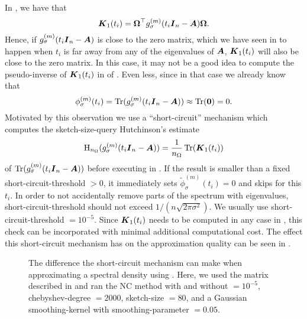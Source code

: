 In , we have that
\begin{equation}
    \boldsymbol{K}_1(t_i) = \boldsymbol{\Omega}^{\top} g_{\sigma}^{(m)}(t_i\boldsymbol{I}_n - \boldsymbol{A}) \boldsymbol{\Omega}.
    \label{equ:3-nystrom-interpolated-matrix}
\end{equation}
Hence, if $g_{\sigma}^{(m)}(t_i\boldsymbol{I}_n - \boldsymbol{A})$ is close to the zero matrix,
which we have seen in  to happen when
$t_i$ is far away from any of the eigenvalues of $\boldsymbol{A}$, $\boldsymbol{K}_1(t_i)$ will
also be close to the zero matrix. In this case, it may not be a good idea to
compute the pseudo-inverse of $\boldsymbol{K}_1(t_i)$ in 
of . Even less, since in that case we already know that
\begin{equation}
    \phi_{\sigma}^{(m)}(t_i) = \operatorname{Tr}(g_{\sigma}^{(m)}(t_i\boldsymbol{I}_n - \boldsymbol{A})) \approx \operatorname{Tr}(\boldsymbol{0}) = 0.
    \label{equ:3-nystrom-short-circuit}
\end{equation}
Motivated by this observation we use a \enquote{short-circuit} mechanism which 
computes the \gls{sketch-size}-query Hutchinson's estimate 
\begin{equation}
    \operatorname{H}_{n_{\Omega}}(g_{\sigma}^{(m)}(t_i \boldsymbol{I}_n - \boldsymbol{A})) = \frac{1}{n_{\Omega}} \operatorname{Tr}(\boldsymbol{K}_1(t_i))
    \label{equ:3-nystrom-short-circuit-hutchinson}
\end{equation}
of $\operatorname{Tr}(g_{\sigma}^{(m)}(t_i\boldsymbol{I}_n - \boldsymbol{A}))$
before executing  in .
If the result is smaller than a fixed \gls{short-circuit-threshold} $> 0$, it immediately sets
$\widetilde{\phi}_{\sigma}^{(m)}(t_i)=0$ and skips 
for this $t_i$. In order to not accidentally remove parts of the spectrum with eigenvalues,
\gls{short-circuit-threshold} should not exceed $1/(n \sqrt{2\pi \sigma^2})$.
We usually use \gls{short-circuit-threshold} $= 10^{-5}$. Since $\boldsymbol{K}_1(t_i)$
needs to be computed in any case in ,
this check can be incorporated with minimal additional computational cost. The effect this short-circuit
mechanism has on the approximation quality can be seen in .\\

\begin{figure}[ht]
    \centering
    
    \caption{The difference the short-circuit mechanism can make when approximating
        a spectral density using . 
        Here, we used the matrix described in 
        and ran the \gls{NC} method with and without  $= 10^{-5}$,
        \gls{chebyshev-degree} $=2000$, \gls{sketch-size} $=80$, and a
        Gaussian \gls{smoothing-kernel} with \gls{smoothing-parameter} $=0.05$.}
    \label{fig:3-nystrom-short-circuit-mechanism}
\end{figure}

